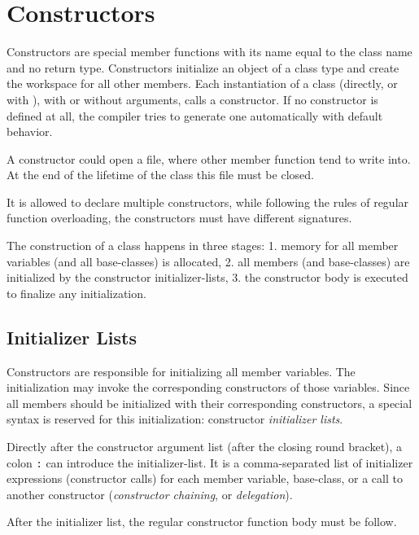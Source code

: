 \section{Constructors\label{sec:constructor}}
Constructors are special member functions with its name equal to the class name and no return type. Constructors initialize an object of a class type
and create the workspace for all other members. Each instantiation of a class (directly, or with ), with or without arguments, calls a constructor.
If no constructor is defined at all, the compiler tries to generate one automatically with default behavior.

\begin{example}
  A constructor could open a file, where other member function tend to write into. At the end of the lifetime of the class this file must be closed.
\end{example}

It is allowed to declare multiple constructors, while following the rules of regular function overloading, \ie the constructors must have different signatures.

The construction of a class happens in three stages: 1. memory for all member variables (and all base-classes) is allocated, 2. all members (and base-classes) are
initialized by the constructor initializer-lists, 3. the constructor body is executed to finalize any initialization.

\subsection{Initializer Lists}
Constructors are responsible for initializing all member variables. The initialization may invoke the corresponding constructors of those variables. Since all
members should be initialized with their corresponding constructors, a special syntax is reserved for this initialization: constructor \emph{initializer lists}.

Directly after the constructor argument list (after the closing round bracket), a colon \texttt{:} can introduce the initializer-list. It is a comma-separated
list of initializer expressions (constructor calls) for each member variable, base-class, or a call to another constructor (\emph{constructor chaining}, or
\emph{delegation}).

After the initializer list, the regular constructor function body must be follow.

